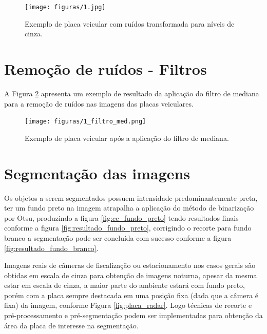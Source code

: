 \documentclass[
	12pt,				%
    oneside,			%
	a4paper,			%
	english,			%
	french,				%
	spanish,			%
	brazil,				%
	]{abntex2}
\begin{document}
\begin{figure}[!ht]
    \centering
    \texttt{[image: figuras/1.jpg]}
    \caption{Exemplo de placa veicular com ruídos transformada para níveis de cinza.}
    \label{fig:placa_cinza}
\end{figure}

\section{Remoção de ruídos - Filtros}
A Figura \ref{fig:placa_medfilt} apresenta um exemplo de resultado da aplicação do filtro de mediana para a remoção de ruídos nas imagens das placas veiculares.

\begin{figure}[!ht]
    \centering
    \texttt{[image: figuras/1\_filtro\_med.png]}
    \caption{Exemplo de placa veicular após a aplicação do filtro de mediana.}
    \label{fig:placa_medfilt}
\end{figure}

\section{Segmentação das imagens}

Os objetos a serem segmentados possuem intensidade predominantemente preta, ter um fundo preto na imagem atrapalha a aplicação do método de binarização por Otsu, produzindo a figura \ref{fig:cc_fundo_preto} tendo resultados finais conforme a figura \ref{fig:resultado_fundo_preto}, corrigindo o recorte para fundo branco a segmentação pode ser concluída com sucesso conforme a figura \ref{fig:resultado_fundo_branco}.

Imagens reais de câmeras de fiscalização ou estacionamento nos casos gerais são obtidas em escala de cinza para obtenção de imagens noturna, apesar da mesma estar em escala de cinza, a maior parte do ambiente estará com fundo preto, porém com a placa sempre destacada em uma posição fixa (dada que a câmera é fixa) da imagem, conforme Figura \ref{fig:placa_radar}. Logo técnicas de recorte e pré-processamento e pré-segmentação podem ser implementadas para obtenção da área da placa de interesse na segmentação.
\end{document}
